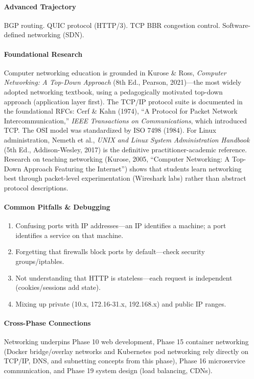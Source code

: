 \documentclass[11pt, a4paper, oneside]{report}
\begin{document}
\paragraph{Advanced Trajectory} BGP routing. QUIC protocol (HTTP/3). TCP BBR congestion control. Software-defined networking (SDN).


\paragraph{Foundational Research} Computer networking education is grounded in Kurose \& Ross, \emph{Computer Networking: A Top-Down Approach} (8th Ed., Pearson, 2021)---the most widely adopted networking textbook, using a pedagogically motivated top-down approach (application layer first). The TCP/IP protocol suite is documented in the foundational RFCs: Cerf \& Kahn (1974), ``A Protocol for Packet Network Intercommunication,'' \emph{IEEE Transactions on Communications}, which introduced TCP. The OSI model was standardized by ISO 7498 (1984). For Linux administration, Nemeth et al., \emph{UNIX and Linux System Administration Handbook} (5th Ed., Addison-Wesley, 2017) is the definitive practitioner-academic reference. Research on teaching networking (Kurose, 2005, ``Computer Networking: A Top-Down Approach Featuring the Internet'') shows that students learn networking best through packet-level experimentation (Wireshark labs) rather than abstract protocol descriptions.

\paragraph{Common Pitfalls \& Debugging}
\begin{enumerate}[leftmargin=*]
\item Confusing ports with IP addresses---an IP identifies a machine; a port identifies a service on that machine.
\item Forgetting that firewalls block ports by default---check security groups/iptables.
\item Not understanding that HTTP is stateless---each request is independent (cookies/sessions add state).
\item Mixing up private (10.x, 172.16-31.x, 192.168.x) and public IP ranges.
\end{enumerate}

\paragraph{Cross-Phase Connections} Networking underpins Phase 10 web development, Phase 15 container networking (Docker bridge/overlay networks and Kubernetes pod networking rely directly on TCP/IP, DNS, and subnetting concepts from this phase), Phase 16 microservice communication, and Phase 19 system design (load balancing, CDNs).
\end{document}
